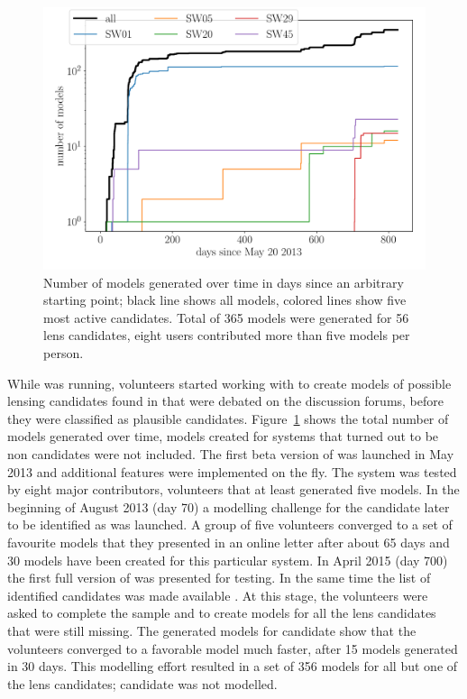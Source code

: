 \begin{figure}
  \includegraphics[width=\linewidth]{img/timelapse3}
  \caption{ Number of models generated over time in days since an arbitrary starting point; black line shows all models, colored lines show five most active candidates. Total of 365 models were generated for 56 lens candidates, eight users contributed more than five models per person. }
  \label{fig:time}
\end{figure}

While \SW was running, volunteers started working with \SpL to create models of possible lensing candidates found in \SW that were debated on the \SW discussion forums, before they were classified as plausible candidates.
Figure~\ref{fig:time} shows the total number of models generated over time, models created for systems that turned out to be non candidates were not included.
The first beta version of \SpL was launched in May 2013 and additional features were implemented on the fly.
The system was tested by eight major contributors, volunteers that at least generated five models.
In the beginning of August 2013 (day 70) a modelling challenge for the candidate later to be identified as  was launched.
A group of five volunteers converged to a set of favourite models that they presented in an online letter after about 65 days and 30 models have been created for this particular system.
In April 2015 (day 700) the first full version of \SpL was presented for testing.
In the same time the list of identified candidates was made available \citep[as a preprint of the later work][]{2016MNRAS.455.1191M}.
At this stage, the volunteers were asked to complete the sample and to create models for all the lens candidates that were still missing.
The generated models for candidate  show that the volunteers converged to a favorable model much faster, after 15 models generated in 30 days.
This modelling effort resulted in a set of 356 \SpL models for all but one of the  lens candidates; candidate  was not modelled.


